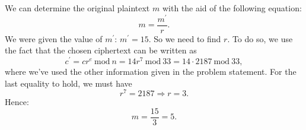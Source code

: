 \documentclass[11pt]{article}
\newcommand{\Mod}{\:\mathrm{mod}\:}
\begin{document}
We can determine the original plaintext \(m\) with the aid of the following equation:
\begin{equation}
m=\frac{m^{\prime}}{r}.
\end{equation}
We were given the value of \(m^{\prime}\): \(m^{\prime}=15\). So we need to find \(r\).
To do so, we use the fact that the chosen ciphertext can be written as
\begin{equation}
c^{\prime}=cr^e\Mod n=14r^7\Mod 33=14\cdot 2187\Mod 33,
\end{equation}
where we've used the other information given in the problem statement. For the
last equality to hold, we must have
\begin{equation}
r^7=2187\Rightarrow r=3.
\end{equation}
Hence:
\begin{equation}
m=\frac{15}{3}=5.
\end{equation}
\end{document}
